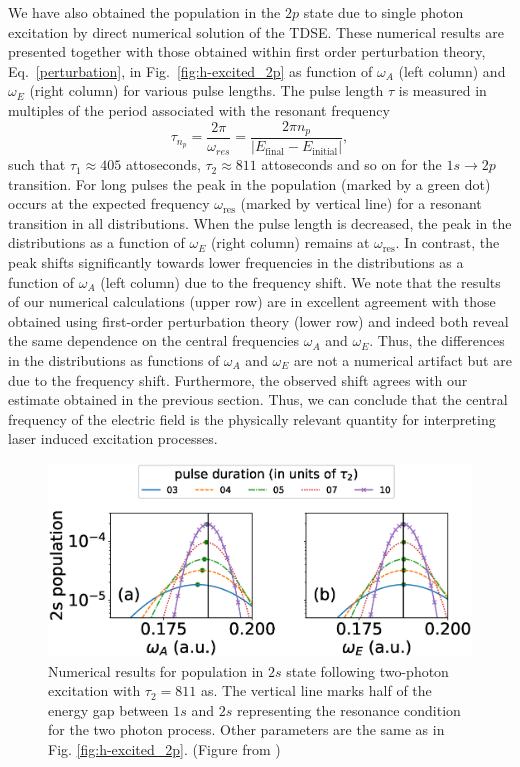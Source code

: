 We have also obtained the population in the $2p$ state due to single photon excitation by direct numerical solution of the TDSE. These numerical results are presented together with those obtained within first order perturbation theory, Eq.~\ref{perturbation}, in Fig.~\ref{fig:h-excited_2p} as function of $\omega_A$ (left column) and $\omega_E$ (right column) for various pulse lengths. The pulse length $\tau$ is measured in multiples of the period associated with the resonant frequency
\begin{equation}
\tau_{n_p} = \frac{2\pi}{\omega_{res}} = \frac{2\pi n_p}{|E_\text{final}-E_\text{initial}|},
\end{equation}
such that $\tau_1\approx 405$ attoseconds, $\tau_2 \approx 811$ attoseconds and so on for the $1s \rightarrow 2p$ transition. For long pulses the peak in the population (marked by a green dot) occurs at the expected frequency $\omega_\text{res}$ (marked by vertical line) for a resonant transition in all distributions. When the pulse length is decreased, the peak in the distributions as a function of $\omega_E$ (right column) remains at $\omega_\text{res}$. In contrast, the peak shifts significantly towards lower frequencies in the distributions as a function of $\omega_A$ (left column) due to the frequency shift. We note that the results of our numerical calculations (upper row) are in excellent agreement with those obtained using first-order perturbation theory (lower row) and indeed both reveal the same dependence on the central frequencies $\omega_A$ and $\omega_E$. Thus, the differences in the distributions as functions of $\omega_A$ and $\omega_E$ are not a numerical artifact but are due to the frequency shift. Furthermore, the observed shift agrees with our estimate obtained in the previous section. Thus, we can conclude that the central frequency of the electric field is the physically relevant quantity for interpreting laser induced excitation processes.


\begin{figure}[!ht]
\centering
       \includegraphics[width=0.8\linewidth]{figs/Frequency_shift/2s_population_comb.eps}
\caption{
Numerical results for population in $2s$ state following two-photon excitation with $\tau_2=811$ as. The vertical line marks half of the energy gap between $1s$ and $2s$ representing the resonance condition for the two photon process. Other parameters are the same as in Fig.  \ref{fig:h-excited_2p}. (Figure from \cite{venzke2018_Central})
}
  \label{fig:h-excited_2s}
\end{figure}

